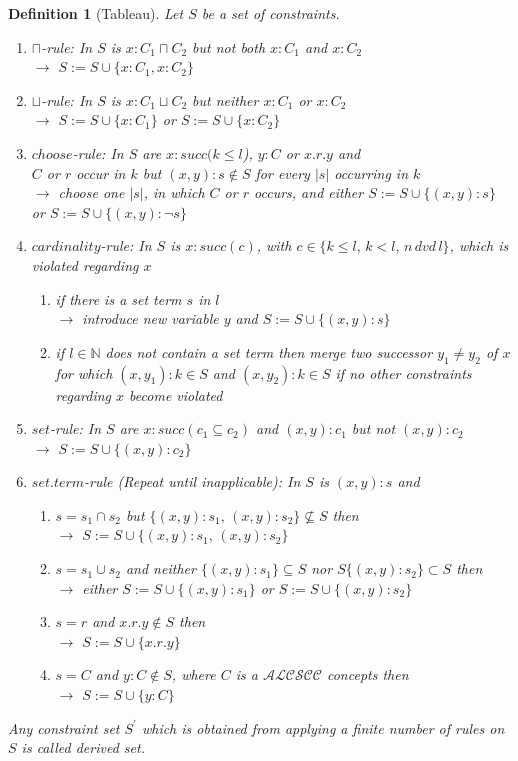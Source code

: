 \documentclass[a4paper,11pt]{scrartcl}
\theoremstyle{break}
\newtheorem{mydef}{Definition}
\begin{document}
\begin{mydef}[Tableau]
Let $S$ be a set of constraints. 
\begin{enumerate}
\item\label{cap} $\sqcap$-rule: In $S$ is $x:C_1\sqcap C_2$ but not both $x:C_1$ and $x:C_2$\\
$\rightarrow$ $S:=S\cup\{x:C_1, x:C_2\}$
\item\label{cup} $\sqcup$-rule: In $S$ is $x:C_1\sqcup C_2$ but neither $x:C_1$ or $x:C_2$\\
$\rightarrow$ $S:=S\cup\{x:C_1\}$ or $S:=S\cup\{x:C_2\}$
\item\label{choose}$choose$-rule: In $S$ are
$x:succ(k\leq l$), $y:C$ or $x.r.y$ and\\ $C$ or $r$ occur in $k$ but $(x,y):s\not\in S$ for every $|s|$ occurring in $k$\\
$\rightarrow$ choose one $|s|$, in which $C$ or $r$ occurs, and either $S:=S\cup\{(x,y):s\}$ or $S:=S\cup\{(x,y):\neg s\}$
\item\label{c}$cardinality$-rule: In $S$ is $x:succ(c)$, with $c\in\{k\leq l,\,k<l,\, n\, dvd\,l\}$, which is violated regarding $x$
\begin{enumerate}
\item \label{setterm} if there is a set term $s$ in $l$\\
$\rightarrow$ introduce new variable $y$ and $S:=S\cup\{(x,y):s\}$
\item \label{exceeded} if $l\in \mathbb{N}$ does not contain a set term then merge two successor $y_1\neq y_2$ of $x$ for which $(x,y_1):k\in S$ and $(x,y_2):k\in S$ if no other constraints regarding $x$ become violated
\end{enumerate}
\item\label{s}$set$-rule: In $S$ are $x:succ(c_1\subseteq c_2)$ and $(x,y):c_1$ but not $(x,y):c_2$\\
$\rightarrow$ $S:=S\cup\{(x,y):c_2\}$
\item\label{repeat} $set.term$-rule (Repeat until inapplicable): In $S$ is $(x,y):s$ and
\begin{enumerate}
\item\label{setterm1} $s=s_1\cap s_2$ but $\{(x,y):s_1,\,(x,y):s_2\}\not\subseteq S$ then\\
$\rightarrow$ $S:=S\cup \{(x,y):s_1,\,(x,y):s_2\}$ 
\item\label{setterm2} $s=s_1\cup s_2$ and neither $\{(x,y):s_1\}\subseteq S$ nor $S\{(x,y):s_2\}\subset S$ then\\
$\rightarrow$ either $S:=S\cup \{(x,y):s_1\}$ or $S:=S\cup \{(x,y):s_2\}$ 
\item\label{setterm3} $s=r$ and $x.r.y\notin S$ then \\
$\rightarrow$ $S:=S\cup\{x.r.y\}$
\item\label{setterm4} $s=C$ and $y:C\notin S$, where $C$ is a $\mathcal{ALCSCC}$ concepts then \\
$\rightarrow$ $S:=S\cup\{y:C\}$
\end{enumerate}
\end{enumerate}
Any constraint set $S^\prime$ which is obtained from applying a finite number of rules on $S$ is called \textit{derived set}.
\end{mydef}
\end{document}
